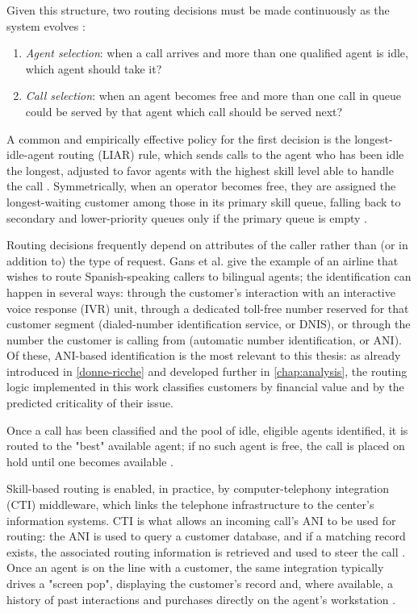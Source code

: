 \documentclass[12pt,a4paper,openright,twoside]{book}
\begin{document}
Given this structure, two routing decisions must be made continuously as the system evolves \cite{garnett2000introduction, mazzuchi2004analyzing}:
\begin{enumerate}
    \item \emph{Agent selection}: when a call arrives and more than one qualified agent is idle, which agent should take it?
    \item \emph{Call selection}: when an agent becomes free and more than one call in queue could be served by that agent which call should be served next?
\end{enumerate}
A common and empirically effective policy for the first decision is the longest-idle-agent routing (LIAR) rule,
which sends calls to the agent who has been idle the longest, adjusted to favor agents with the highest skill level
able to handle the call \cite{mazzuchi2004analyzing}. Symmetrically, when an operator becomes free, they are assigned
the longest-waiting customer among those in its primary skill queue, falling back to secondary and lower-priority queues
only if the primary queue is empty \cite{mazzuchi2004analyzing}.

Routing decisions frequently depend on attributes of the caller rather than (or in addition to)
the type of request. Gans et al. \cite{gans2003telephone} give the example of an airline that
wishes to route Spanish-speaking callers to bilingual agents; the identification can happen in
several ways: through the customer's interaction with an interactive voice response (IVR) unit,
through a dedicated toll-free number reserved for that customer segment (dialed-number identification service, or DNIS),
or through the number the customer is calling from (automatic number identification, or ANI).
Of these, ANI-based identification is the most relevant to this thesis: as already introduced in \cref{donne-ricche}
and developed further in \cref{chap:analysis}, the routing logic implemented in this work classifies customers
by financial value and by the predicted criticality of their issue.

Once a call has been classified and the pool of idle, eligible agents identified, it is routed to the "best" available agent;
if no such agent is free, the call is placed on hold until one becomes available \cite{gans2003telephone}.

Skill-based routing is enabled, in practice, by computer-telephony integration (CTI) middleware,
which links the telephone infrastructure to the center's information systems.
CTI is what allows an incoming call's ANI to be used for routing: the ANI is used to query a customer database,
and if a matching record exists, the associated routing information is retrieved and used to steer the call \cite{gans2003telephone}.
Once an agent is on the line with a customer, the same integration typically drives a "screen pop",
displaying the customer's record and, where available, a history of past interactions and purchases directly
on the agent's workstation \cite{gans2003telephone}.
\end{document}

